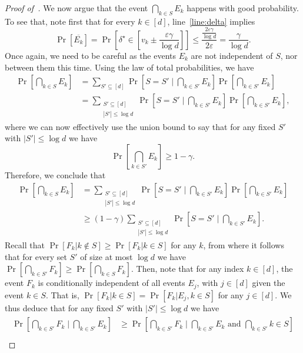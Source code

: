 \begin{proof}[Proof of~]
We now argue that the event $\bigcap_{k \in S} E_k$ happens with good probability.
To see that, note first that for every $k \in [d]$, line~\ref{line:delta} implies
\[
	\Pr[\overline{E_k}] = \Pr\left[\delta^\star \in \left[v_k \pm \frac{\varepsilon \gamma}{\log d}\right]\right] \leq \frac{\frac{2\varepsilon \gamma}{\log d}}{2\varepsilon} = \frac{\gamma}{\log d}.
\]
Once again, we need to be careful as the events $E_k$ are not independent of $S$, nor between them this time.
Using the law of total probabilities, we have 
\begin{align*}
	\Pr\left[\bigcap_{k \in S} E_k\right] &= \sum_{S' \subseteq [d]} \Pr\left[S = S'  \mid \bigcap_{k \in S'} E_k \right] \Pr\left[\bigcap_{k \in S'} E_k\right]\\
	&= \sum_{\substack{S' \subseteq [d]\\ |S'| \leq \log d}} \Pr\left[S = S' \mid \bigcap_{k \in S'} E_k\right] \Pr\left[\bigcap_{k \in S'} E_k\right],
\end{align*}
where we can now effectively use the union bound to say that for any fixed $S'$ with $|S'| \leq \log d$ we have
\[ 
	\Pr\left[\bigcap_{k \in S'} E_k \right] \geq 1 - \gamma.
\]
Therefore, we conclude that
\begin{align*}
	\Pr\left[\bigcap_{k \in S} E_k\right] &=  \sum_{\substack{S' \subseteq [d]\\ |S'| \leq \log d}} \Pr\left[S = S'\mid \bigcap_{k \in S'} E_k\right] \Pr\left[\bigcap_{k \in S'} E_k\right]\\
	&\geq (1-\gamma) \sum_{\substack{S' \subseteq [d]\\ |S'| \leq \log d}} \Pr\left[S = S' \mid \bigcap_{k \in S'} E_k\right]. \tag{$\dagger$}
\end{align*}
Recall that $\Pr[F_k | k \not\in S] \geq \Pr[F_k | k \in S]$ for any $k$, from where it follows that for every set $S'$ of size at most $\log d$ we have 
\(
	\Pr\left[\bigcap_{k \in S'} F_k \right] \geq \Pr\left[\bigcap_{k \in S} F_k \right].	
\)
Then, note that for any index $k \in [d]$, the event $F_k$ is conditionally independent of all events $E_{j}$, with $j \in [d]$ given the event $k \in S$. That is,
\(
	\Pr\left[F_k | k \in S\right] = \Pr\left[F_k | E_{j}, k \in S\right] 
\)
for any  $j \in [d]$.
We thus deduce that for any fixed $S'$ with $|S'| \leq \log d$ we have
\begin{align}\label{eq:2}
	\begin{split}
	\Pr\left[\bigcap_{k \in S'} F_k \mid \bigcap_{k \in S'} E_k\right] &    \geq  \Pr\left[\bigcap_{k \in S'} F_k \mid \bigcap_{k \in S'} E_k \text{ and  } \bigcap_{k \in S'} {k \in S}\right] \\

\end{split}
\end{align}
\end{proof}
